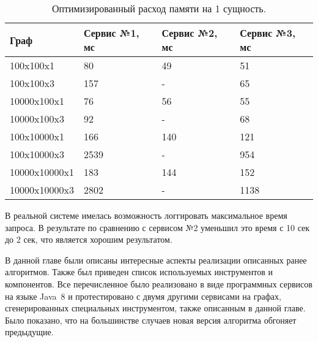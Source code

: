 \begin{table}[!h]
	\caption{Оптимизированный расход памяти на 1 сущность.}\label{tab3}
	\centering
	\begin{tabu}{|*{4}{X[c]|}}\hline
		Граф & Сервис №1, мс & Сервис №2, мс & Сервис №3, мс \\\hline
		100x100x1  & 80 & 49 & 51\\\hline
		100x100x3  & 157 & - & 65\\\hline
		10000x100x1  & 76 & 56 & 55\\\hline
		10000x100x3  & 92 & - & 68\\\hline
		100x10000x1  & 166 & 140 & 121\\\hline
		100x10000x3  & 2539 & - & 954\\\hline
		10000x10000x1  & 183 & 144 & 152\\\hline
		10000x10000x3  & 2802 & - & 1138\\\hline
	\end{tabu}
\end{table}

В реальной системе имелась возможность логгировать максимальное время запроса. В результате по сравнению с сервисом №2 уменьшил это время с 10 сек до 2 сек, что является хорошим результатом.

\chapterconclusion
В данной главе были описаны интересные аспекты реализации описанных ранее алгоритмов. Также был приведен список используемых инструментов и компонентов. Все перечисленное было реализовано в виде программных сервисов на языке Java~8 и протестировано с двумя другими сервисами на графах, сгенерированных специальных инструментом, также описанным в данной главе. Было показано, что на большинстве случаев новая версия алгоритма обгоняет предыдущие.
